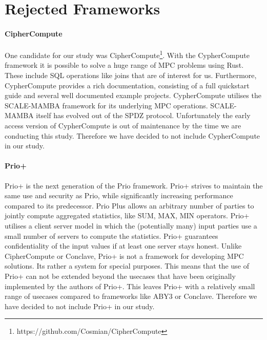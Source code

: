 \section{Rejected Frameworks}
\paragraph{CipherCompute}
One candidate for our study was CipherCompute\footnote{https://github.com/Cosmian/CipherCompute}. With the CypherCompute framework it is possible to solve a huge range of MPC problems using Rust. These include SQL operations like joins that are of interest for us. Furthermore, CypherCompute provides a rich documentation, consisting of a full quickstart guide and several well documented example projects. CypherCompute utilises the SCALE-MAMBA \cite{aly2021scale} framework for its underlying MPC operations. SCALE-MAMBA  itself has evolved out of the SPDZ \cite{SPDZ} protocol. Unfortunately the early access version of CypherCompute is out of maintenance by the time we are conducting this study. Therefore we have decided to not include CypherCompute in our study.

\paragraph{Prio+}
Prio+ \cite{cryptoeprint:2021:576} is the next generation of the Prio \cite{201553} framework. Prio+ strives to maintain the same use and security as Prio, while significantly increasing performance compared to its predecessor. Prio Plus allows an arbitrary number of parties to jointly compute aggregated statistics, like SUM, MAX, MIN operators. Prio+ utilises a client server model in which the (potentially many) input parties use a small number of servers to compute the statistics. Prio+ guarantees confidentiality of the input values if at least one server stays honest. Unlike CipherCompute or Conclave, Prio+ is not a framework for developing MPC solutions. Its rather a system for special purposes. This means that the use of Prio+ can not be extended beyond the usecases that have been originally implemented by the authors of Prio+. This leaves Prio+ with a relatively small range of usecases compared to frameworks like ABY3 or Conclave. Therefore we have decided to not include Prio+ in our study.

